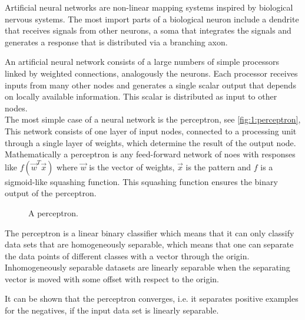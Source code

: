 Artificial neural networks are non-linear mapping systems inspired by biological nervous systems. The most import parts of a biological neuron include a dendrite that receives signals from other neurons, a soma that integrates the signals and generates a response that is distributed via a branching axon. 

An artificial neural network consists of a large numbers of simple processors linked by weighted connections, analogously the neurons. Each processor receives inputs from many other nodes and generates a single scalar output that depends on locally available information. This scalar is distributed as input to other nodes. \\

The most simple case of a neural network is the perceptron, see \autoref{fig:1:perceptron}, This network consists of one layer of input nodes, connected to a processing unit through a single layer of weights, which determine the result of the output node. Mathematically a perceptron is any feed-forward network of noes with responses like $f(\vec{w}^T\vec{x})$ where $\vec{w}$ is the vector of weights, $\vec{x}$ is the pattern and $f$ is a sigmoid-like squashing function\cite{reed1998neural}. This squashing function ensures the binary output of the perceptron. 

\begin{figure}[H]
	\centering
	\caption{A perceptron.}
	\label{fig:1:perceptron}
\end{figure}

The perceptron is a linear binary classifier which means that it can only classify data sets that are homogeneously separable, which means that one can separate the data points of different classes with a vector through the origin. Inhomogeneously separable datasets are linearly separable when the separating vector is moved with some offset with respect to the origin.

It can be shown that the perceptron converges, i.e. it separates positive examples for the negatives, if the input data set is linearly separable. 




